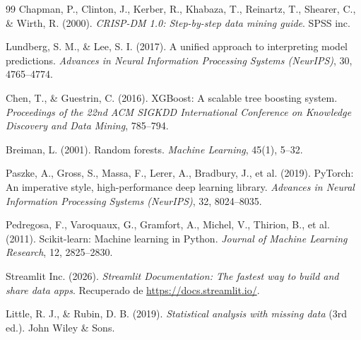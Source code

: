 \documentclass[11pt,letterpaper]{article}
\begin{document}
\begin{thebibliography}{99}
Chapman, P., Clinton, J., Kerber, R., Khabaza, T., Reinartz, T., Shearer, C., \& Wirth, R. (2000). \textit{CRISP-DM 1.0: Step-by-step data mining guide}. SPSS inc.

Lundberg, S. M., \& Lee, S. I. (2017). A unified approach to interpreting model predictions. \textit{Advances in Neural Information Processing Systems (NeurIPS)}, 30, 4765--4774.

Chen, T., \& Guestrin, C. (2016). XGBoost: A scalable tree boosting system. \textit{Proceedings of the 22nd ACM SIGKDD International Conference on Knowledge Discovery and Data Mining}, 785--794.

Breiman, L. (2001). Random forests. \textit{Machine Learning}, 45(1), 5--32.

Paszke, A., Gross, S., Massa, F., Lerer, A., Bradbury, J., et al. (2019). PyTorch: An imperative style, high-performance deep learning library. \textit{Advances in Neural Information Processing Systems (NeurIPS)}, 32, 8024--8035.

Pedregosa, F., Varoquaux, G., Gramfort, A., Michel, V., Thirion, B., et al. (2011). Scikit-learn: Machine learning in Python. \textit{Journal of Machine Learning Research}, 12, 2825--2830.

Streamlit Inc. (2026). \textit{Streamlit Documentation: The fastest way to build and share data apps}. Recuperado de \url{https://docs.streamlit.io/}.

Little, R. J., \& Rubin, D. B. (2019). \textit{Statistical analysis with missing data} (3rd ed.). John Wiley \& Sons.
\end{thebibliography}
\end{document}
